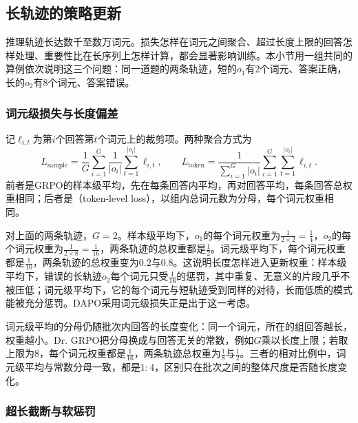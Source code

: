 \subsection{长轨迹的策略更新}
\label{sec:nlp-reasoning-long-updates}

推理轨迹长达数千至数万词元。损失怎样在词元之间聚合、超过长度上限的回答怎样处理、重要性比在长序列上怎样计算，都会显著影响训练。本小节用一组共同的算例依次说明这三个问题：同一道题的两条轨迹，短的$o_1$有2个词元、答案正确，长的$o_2$有8个词元、答案错误。

\subsubsection{词元级损失与长度偏差}
\label{sec:nlp-reasoning-token-loss}

记$\ell_{i,t}$为第$i$个回答第$t$个词元上的裁剪项。两种聚合方式为
\[
  L_{\mathrm{sample}}=\frac1G\sum_{i=1}^{G}\frac1{|o_i|}\sum_{t=1}^{|o_i|}\ell_{i,t},\qquad
  L_{\mathrm{token}}=\frac{1}{\sum_{i=1}^{G}|o_i|}\sum_{i=1}^{G}\sum_{t=1}^{|o_i|}\ell_{i,t}.
\]
前者是GRPO的样本级平均，先在每条回答内平均，再对回答平均，每条回答总权重相同；后者是（token-level loss），以组内总词元数为分母，每个词元权重相同。

对上面的两条轨迹，$G=2$。样本级平均下，$o_1$的每个词元权重为$\frac1{2\times2}=\frac14$，$o_2$的每个词元权重为$\frac1{2\times8}=\frac1{16}$，两条轨迹的总权重都是$\frac12$。词元级平均下，每个词元权重都是$\frac1{10}$，两条轨迹的总权重变为$0.2$与$0.8$。这说明长度怎样进入更新权重：样本级平均下，错误的长轨迹$o_2$每个词元只受$\frac1{16}$的惩罚，其中重复、无意义的片段几乎不被压低；词元级平均下，它的每个词元与短轨迹受到同样的对待，长而低质的模式能被充分惩罚。DAPO采用词元级损失正是出于这一考虑。

词元级平均的分母仍随批次内回答的长度变化：同一个词元，所在的组回答越长，权重越小。Dr. GRPO把分母换成与回答无关的常数，例如$G$乘以长度上限；若取上限为8，每个词元权重都是$\frac1{16}$，两条轨迹总权重为$\frac18$与$\frac12$。三者的相对比例中，词元级平均与常数分母一致，都是$1:4$，区别只在批次之间的整体尺度是否随长度变化。

\subsubsection{超长截断与软惩罚}
\label{sec:nlp-reasoning-overlong}

